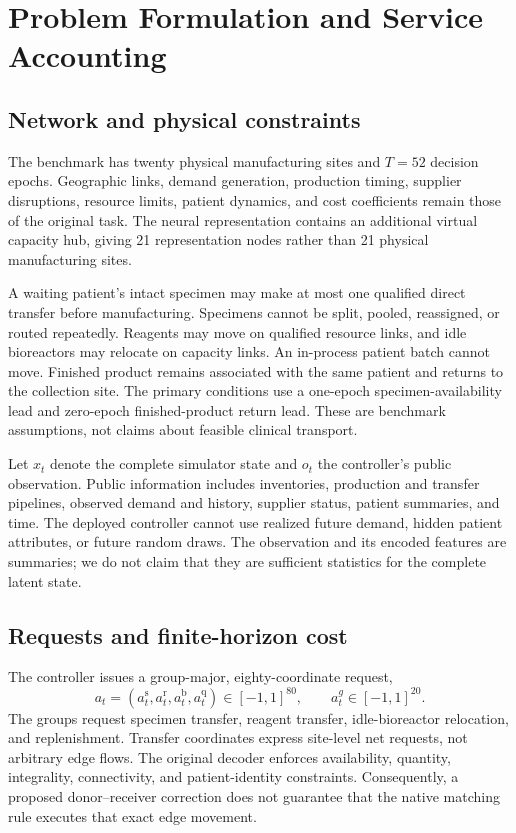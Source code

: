 \documentclass[preprint,12pt]{elsarticle}
\begin{document}


\section{Problem Formulation and Service Accounting}
\label{sec:problem}
\subsection{Network and physical constraints}
The benchmark has twenty physical manufacturing sites and $T=52$ decision
epochs. Geographic links, demand generation, production timing, supplier
disruptions, resource limits, patient dynamics, and cost coefficients remain
those of the original task. The neural representation contains an additional
virtual capacity hub, giving 21 representation nodes rather than 21 physical
manufacturing sites.

A waiting patient's intact specimen may make at most one qualified direct
transfer before manufacturing. Specimens cannot be split, pooled, reassigned,
or routed repeatedly. Reagents may move on qualified resource links, and idle
bioreactors may relocate on capacity links. An in-process patient batch cannot
move. Finished product remains associated with the same patient and returns to
the collection site. The primary conditions use a one-epoch specimen-availability
lead and zero-epoch finished-product return lead. These are benchmark assumptions,
not claims about feasible clinical transport.

Let $x_t$ denote the complete simulator state and $o_t$ the controller's public
observation. Public information includes inventories, production and transfer
pipelines, observed demand and history, supplier status, patient summaries, and
time. The deployed controller cannot use realized future demand, hidden patient
attributes, or future random draws. The observation and its encoded features
are summaries; we do not claim that they are sufficient statistics for the
complete latent state.

\subsection{Requests and finite-horizon cost}
The controller issues a group-major, eighty-coordinate request,
\begin{equation}
 a_t=(a_t^{\mathrm{s}},a_t^{\mathrm{r}},a_t^{\mathrm{b}},
      a_t^{\mathrm{q}})\in[-1,1]^{80},
 \qquad a_t^g\in[-1,1]^{20}.
 \label{eq:action}
\end{equation}
The groups request specimen transfer, reagent transfer, idle-bioreactor
relocation, and replenishment. Transfer coordinates express site-level net
requests, not arbitrary edge flows. The original decoder enforces availability,
quantity, integrality, connectivity, and patient-identity constraints.
Consequently, a proposed donor--receiver correction does not guarantee that the
native matching rule executes that exact edge movement.
\end{document}
